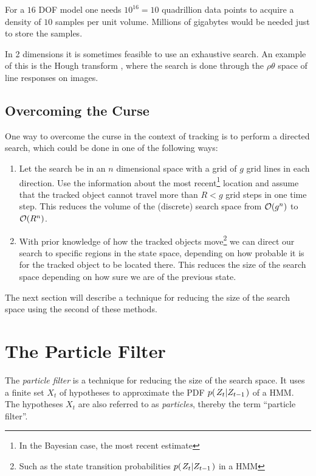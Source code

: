 \begin{example} For a $16$ DOF model one needs $10^{16}=10$
quadrillion data points to acquire a density of $10$ samples per unit
volume. Millions of gigabytes would be needed just to store the
samples.
\end{example}

\begin{example} In 2 dimensions it is sometimes feasible to use an
exhaustive search.  An example of this is the Hough transform
\cite{DigitalImageProcessing}, where the search is done through the
$\rho\theta$ space of line responses on images.
\end{example}

\subsection{Overcoming the Curse}
One way to overcome the curse in the context of tracking is to perform
a directed search, which could be done in one of the following ways:

\begin{enumerate}
\item Let the search be in an $n$ dimensional space with a grid of $g$
  grid lines in each direction. Use the information about the most
  recent\footnote{In the Bayesian case, the most recent estimate}
  location and assume that the tracked object cannot travel more than
  $R < g$ grid steps in one time step.  This reduces the volume of the
  (discrete) search space from $\mathcal{O}{\left(g^n\right)}$ to $\mathcal{O}{\left(R^n\right)}$.
\item With prior knowledge of how the tracked objects
  move\footnote{Such as the state transition probabilities
    $p{(\left. Z_t \middle\vert Z_{t-1} \right.)}$ in a HMM} we can direct our search to specific
  regions in the state space, depending on how probable it is for the
  tracked object to be located there. This reduces the size of the
  search space depending on how sure we are of the previous state.
\end{enumerate}

The next section will describe a technique for reducing the size of
the search space using the second of these methods.


\section{The Particle Filter}

The \emph{particle filter} is a technique for reducing the size of the
search space. It uses a finite set $X_t$ of hypotheses to approximate
the PDF $p{(\left. Z_t \middle\vert Z_{t-1} \right.)}$ of a HMM. The hypotheses $X_t$ are also
referred to as \emph{particles}, thereby the term ``particle filter''.

